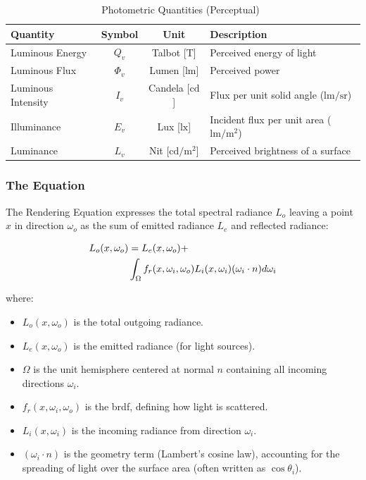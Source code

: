 \begin{table}
    \centering
    \caption{Photometric Quantities (Perceptual)~\cite{tuwien_rendering_2020}}
    \label{tab:photometric-quantities}
    \begin{tabular}{lccl}
        \toprule
        \textbf{Quantity} & \textbf{Symbol} & \textbf{Unit} & \textbf{Description} \\
        \midrule
        Luminous Energy & $Q_v$ & Talbot [$\mathrm{T}$] & Perceived energy of light \\
        Luminous Flux & $\Phi_v$ & Lumen [$\mathrm{lm}$] & Perceived power \\
        Luminous Intensity & $I_v$ & Candela [$\mathrm{cd}$] & Flux per unit solid angle ($\mathrm{lm/sr}$) \\
        Illuminance & $E_v$ & Lux [$\mathrm{lx}$] & Incident flux per unit area ($\mathrm{lm/m^2}$) \\
        Luminance & $L_v$ & Nit [$\mathrm{cd/m^2}$] & Perceived brightness of a surface \\
        \bottomrule
    \end{tabular}
\end{table}

\subsubsection{The Equation}\label{subsubsec:the-equation}

The Rendering Equation expresses the total spectral radiance $L_o$
leaving a point $x$ in direction $\omega_o$ as the sum
of emitted radiance $L_e$ and reflected radiance:

\begin{align}
    L_o(x, \omega_o) &= L_e(x, \omega_o) + \notag \\
    & \int_{\Omega} f_r(x, \omega_i, \omega_o) L_i(x, \omega_i) (\omega_i \cdot n) d\omega_i
    \label{eq:rendering-equation}
\end{align}

where:
\begin{itemize}
    \item $L_o(x, \omega_o)$ is the total outgoing radiance.
    \item $L_e(x, \omega_o)$ is the emitted radiance (for light sources).
    \item $\Omega$ is the unit hemisphere centered at normal $n$ containing all incoming directions $\omega_i$.
    \item $f_r(x, \omega_i, \omega_o)$ is the \gls{brdf}, defining how light is scattered.
    \item $L_i(x, \omega_i)$ is the incoming radiance from direction $\omega_i$.
    \item $(\omega_i \cdot n)$ is the geometry term (Lambert's cosine law),
        accounting for the spreading of light over the surface area (often written as $\cos\theta_i$).
\end{itemize}

